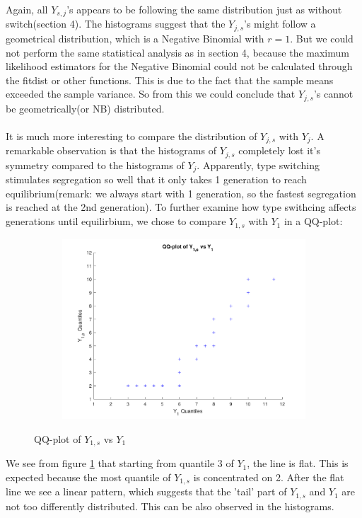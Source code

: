 Again, all $Y_{s,j}$'s appears to be following the same distribution just as without switch(section 4). The histograms suggest that the $Y_{j,s}$'s might follow a geometrical distribution, which is a Negative Binomial with $r=1$. But we could not perform the same statistical analysis as in section 4, because the maximum likelihood estimators for the Negative Binomial could not be calculated through the fitdist or other functions. This is due to the fact that the sample means exceeded the sample variance. So from this we could conclude that $Y_{j,s}$'s cannot be geometrically(or NB) distributed.\\
\\
It is much more interesting to compare the distribution of $Y_{j,s}$ with $Y_{j}$. A remarkable observation is that the histograms of $Y_{j,s}$ completely lost it's symmetry compared to the histograms of $Y_j$. Apparently, type switching stimulates segregation so well that it only takes 1 generation to reach equilibrium(remark: we always start with 1 generation, so the fastest segregation is reached at the 2nd generation). To further examine how type swithcing affects generations until equilirbium, we chose to compare $Y_{1,s}$ with $Y_1$ in a QQ-plot:
\begin{figure}[H]
    \centering
    \begin{subfigure}{0.8\textwidth}
        \includegraphics[width=\textwidth]{QQplotY1sw.pdf}
    \end{subfigure}
    \caption{QQ-plot of $Y_{1,s}$ vs $Y_1$}
    \label{fig:QQplotSw}
\end{figure}  
We see from figure \ref{fig:QQplotSw} that starting from quantile 3 of $Y_1$, the line is flat. This is expected because the most quantile of $Y_{1,s}$ is concentrated on 2. After the flat line we see a linear pattern, which suggests that the 'tail' part of $Y_{1,s}$ and $Y_1$ are not too differently distributed. This can be also observed in the histograms.

